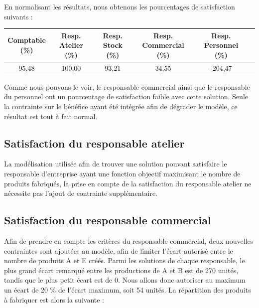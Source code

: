 \documentclass[paper=a4, fontsize=11pt]{report}
\numberwithin{equation}{section}		%
\numberwithin{figure}{section}			%
\numberwithin{table}{section}				%
\begin{document}
En normalisant les résultats, nous obtenons les pourcentages de satisfaction suivants : 

\begin{table}[H]
\begin{center}
\begin{tabular}{c|ccccc}
\shortstack{Comptable \\ \scriptsize{(\%)}} & \shortstack{Resp. Atelier \\ \scriptsize (\%)} & \shortstack{Resp.  Stock \\ \scriptsize (\%)} & \shortstack{Resp.  Commercial \\ \scriptsize (\%)} &   \shortstack{Resp.  Personnel \\ \scriptsize (\%)} \\ 
\hline 
95,48 & 100,00 & 93,21 & 34,55 & -204,47 \\
\end{tabular}
\end{center}
\end{table}

Comme nous pouvons le voir, le responsable commercial ainsi que le responsable du personnel ont un pourcentage de satisfaction faible avec cette solution. Seule la contrainte sur le bénéfice ayant été intégrée afin de dégrader le modèle, ce résultat est tout à fait normal.

\subsection{Satisfaction du responsable atelier}

La modélisation utilisée afin de trouver une solution pouvant satisfaire le responsable d'entreprise ayant une fonction objectif maximisant le nombre de produits fabriqués, la prise en compte de la satisfaction du responsable atelier ne nécessite pas l'ajout de contrainte supplémentaire.

\subsection{Satisfaction du responsable commercial}

Afin de prendre en compte les critères du responsable commercial, deux nouvelles contraintes sont ajoutées au modèle, afin de limiter l'écart autorisé entre le nombre de produits A et E créés. Parmi les solutions de chaque responsable, le plus grand écart remarqué entre les productions de A et B est de 270 unités, tandis que le plus petit écart est de 0. Nous allons donc autoriser au maximum un écart de 20 \% de l'écart maximum, soit 54 unités. La répartition des produits à fabriquer est alors la suivante : 
\end{document}
